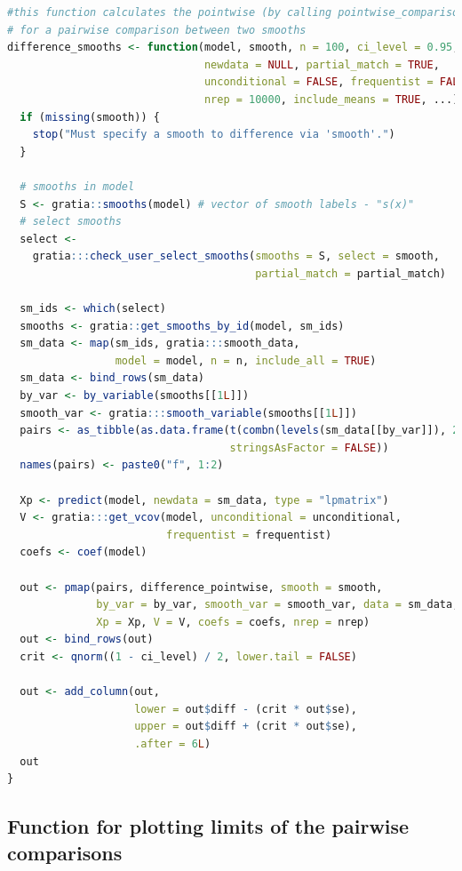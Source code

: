 \documentclass[
]{article}
\begin{document}
\begin{lstlisting}[language=R]
#this function calculates the pointwise (by calling pointwise_comparisons.R) CI and the simultaneous CI
# for a pairwise comparison between two smooths
difference_smooths <- function(model, smooth, n = 100, ci_level = 0.95, 
                               newdata = NULL, partial_match = TRUE,
                               unconditional = FALSE, frequentist = FALSE,
                               nrep = 10000, include_means = TRUE, ...) {
  if (missing(smooth)) {
    stop("Must specify a smooth to difference via 'smooth'.")
  }
  
  # smooths in model
  S <- gratia::smooths(model) # vector of smooth labels - "s(x)"
  # select smooths
  select <-
    gratia:::check_user_select_smooths(smooths = S, select = smooth,
                                       partial_match = partial_match)

  sm_ids <- which(select)
  smooths <- gratia::get_smooths_by_id(model, sm_ids)
  sm_data <- map(sm_ids, gratia:::smooth_data,
                 model = model, n = n, include_all = TRUE)
  sm_data <- bind_rows(sm_data)
  by_var <- by_variable(smooths[[1L]])
  smooth_var <- gratia:::smooth_variable(smooths[[1L]])
  pairs <- as_tibble(as.data.frame(t(combn(levels(sm_data[[by_var]]), 2)),
                                   stringsAsFactor = FALSE))
  names(pairs) <- paste0("f", 1:2)
  
  Xp <- predict(model, newdata = sm_data, type = "lpmatrix")
  V <- gratia:::get_vcov(model, unconditional = unconditional,
                         frequentist = frequentist)
  coefs <- coef(model)
  
  out <- pmap(pairs, difference_pointwise, smooth = smooth, 
              by_var = by_var, smooth_var = smooth_var, data = sm_data,
              Xp = Xp, V = V, coefs = coefs, nrep = nrep)
  out <- bind_rows(out)
  crit <- qnorm((1 - ci_level) / 2, lower.tail = FALSE)
  
  out <- add_column(out,
                    lower = out$diff - (crit * out$se),
                    upper = out$diff + (crit * out$se),
                    .after = 6L)
  out
}
\end{lstlisting}

\hypertarget{function-for-plotting-limits-of-the-pairwise-comparisons}{%
\subsection{Function for plotting limits of the pairwise comparisons}\label{function-for-plotting-limits-of-the-pairwise-comparisons}}
\end{document}
